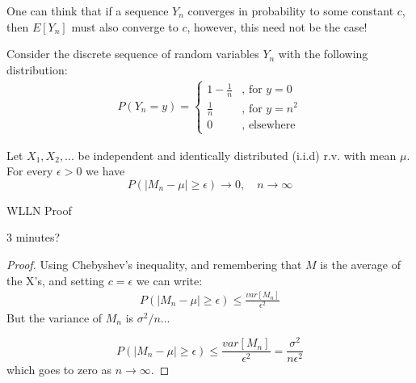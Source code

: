 \documentclass[aspectratio=169]{beamer}
\begin{document}
\begin{frame}
    One can think that if a sequence $Y_n$ converges in probability to some constant $c$, then $E[Y_n]$ must also converge to $c$, however, this need not be the case!
\end{frame}

\begin{frame}
    Consider the discrete sequence of random variables $Y_n$ with the following distribution:
    \begin{align*}
        P(Y_n=y)=\left\{\begin{array}{cc}1-\frac{1}{n}&\text{, for }y=0\\ \frac{1}{n} &\text{, for }y=n^2\\ 0&\text{, elsewhere}\end{array}\right.
    \end{align*}

    
\end{frame}

\begin{frame}
    \begin{theorem}
    Let $X_1,X_2,...$ be independent and identically distributed (i.i.d) r.v. with mean $\mu$. For every $\epsilon>0$ we have
    $$P(|M_n-\mu|\geq \epsilon)\rightarrow 0,\quad n\rightarrow\infty$$
    \end{theorem}
\end{frame}

\begin{frame}{WLLN Proof}

3 minutes?\pause
\begin{proof}
    Using Chebyshev's inequality, and remembering that $M$ is the average of the X's, and setting $c=\epsilon$ we can write:
    \begin{align*}
        P(|M_n-\mu|\geq \epsilon) \leq \frac{var[M_n]}{\epsilon^2}
    \end{align*}
    But the variance of $M_n$ is $\sigma^2/n$...
    
    $$P(|M_n-\mu|\geq \epsilon) \leq \frac{var[M_n]}{\epsilon^2} = \frac{\sigma^2}{n\epsilon^2}$$ which goes to zero as $n\rightarrow\infty$.
\end{proof}
    
\end{frame}
\end{document}

